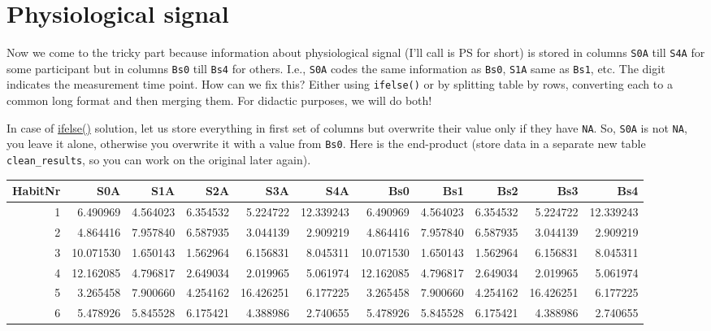 \documentclass[
]{book}
\begin{document}
\hypertarget{physiological-signal}{%
\section{Physiological signal}\label{physiological-signal}}

Now we come to the tricky part because information about physiological signal (I'll call is PS for short) is stored in columns \texttt{S0A} till \texttt{S4A} for some participant but in columns \texttt{Bs0} till \texttt{Bs4} for others. I.e., \texttt{S0A} codes the same information as \texttt{Bs0}, \texttt{S1A} same as \texttt{Bs1}, etc. The digit indicates the measurement time point. How can we fix this? Either using \texttt{ifelse()} or by splitting table by rows, converting each to a common long format and then merging them. For didactic purposes, we will do both!

In case of \href{https://stat.ethz.ch/R-manual/R-devel/library/base/html/ifelse.html}{ifelse()} solution, let us store everything in first set of columns but overwrite their value only if they have \texttt{NA}. So, \texttt{S0A} is not \texttt{NA}, you leave it alone, otherwise you overwrite it with a value from \texttt{Bs0}. Here is the end-product (store data in a separate new table \texttt{clean\_results}, so you can work on the original later again).

\begin{tabular}{r|r|r|r|r|r|r|r|r|r|r}
\hline
HabitNr & S0A & S1A & S2A & S3A & S4A & Bs0 & Bs1 & Bs2 & Bs3 & Bs4\\
\hline
1 & 6.490969 & 4.564023 & 6.354532 & 5.224722 & 12.339243 & 6.490969 & 4.564023 & 6.354532 & 5.224722 & 12.339243\\
\hline
2 & 4.864416 & 7.957840 & 6.587935 & 3.044139 & 2.909219 & 4.864416 & 7.957840 & 6.587935 & 3.044139 & 2.909219\\
\hline
3 & 10.071530 & 1.650143 & 1.562964 & 6.156831 & 8.045311 & 10.071530 & 1.650143 & 1.562964 & 6.156831 & 8.045311\\
\hline
4 & 12.162085 & 4.796817 & 2.649034 & 2.019965 & 5.061974 & 12.162085 & 4.796817 & 2.649034 & 2.019965 & 5.061974\\
\hline
5 & 3.265458 & 7.900660 & 4.254162 & 16.426251 & 6.177225 & 3.265458 & 7.900660 & 4.254162 & 16.426251 & 6.177225\\
\hline
6 & 5.478926 & 5.845528 & 6.175421 & 4.388986 & 2.740655 & 5.478926 & 5.845528 & 6.175421 & 4.388986 & 2.740655\\
\hline
\end{tabular}
\end{document}
